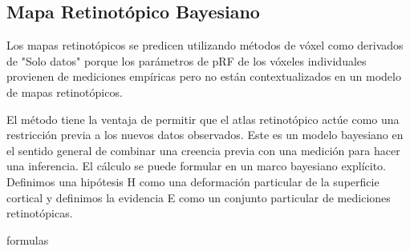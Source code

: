 \subsection{Mapa Retinot\'opico Bayesiano}
Los mapas retinotópicos se predicen utilizando métodos de vóxel como derivados de "Solo datos" porque los parámetros de pRF de los vóxeles individuales provienen de mediciones empíricas pero no están contextualizados en un modelo de mapas retinotópicos.

El método tiene la ventaja de permitir que el atlas retinotópico actúe como una restricción previa a los nuevos datos observados. Este es un modelo bayesiano en el sentido general de combinar una creencia previa con una medición para hacer una inferencia. El cálculo se puede formular en un marco bayesiano explícito. Definimos una hipótesis H como una deformación particular de la superficie cortical y definimos la evidencia E como un conjunto particular de mediciones retinotópicas. %

formulas

